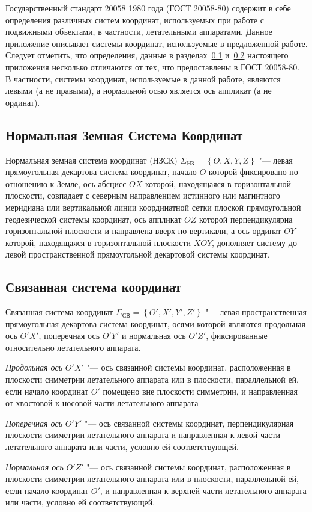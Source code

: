 \documentclass[../main.tex]{subfiles}
\begin{document}
Государственный стандарт $20058$ 1980 года (ГОСТ $20058$-$80$) содержит в себе определения различных систем координат, используемых при работе с подвижными объектами, в частности, летательными аппаратами. Данное приложение описывает системы координат, используемые в предложенной работе. Следует отметить, что определения, данные в разделах~\ref{sec:nzsk} и~\ref{sec:ssk} настоящего приложения несколько отличаются от тех, что предоставлены в ГОСТ $20058$-$80$. В частности, системы координат, используемые в данной работе, являются левыми (а не правыми), а нормальной осью является ось аппликат (а не ординат).

\subsection{Нормальная Земная Система Координат}\label{sec:nzsk}
Нормальная земная система координат (НЗСК) $\Sigma_{\text{НЗ}} = \left\{O, X, Y, Z\right\}$ "--- левая прямоугольная декартова система координат, начало $O$ которой фиксировано по отношению к Земле, ось абсцисс $OX$ которой, находящаяся в горизонтальной плоскости, совпадает с северным направлением истинного или магнитного меридиана или вертикальной линии координатной сетки плоской прямоугольной геодезической системы координат, ось аппликат $OZ$ которой перпендикулярна горизонтальной плоскости и направлена вверх по вертикали, а ось ординат $OY$ которой, находящаяся в горизонтальной плоскости $XOY$, дополняет систему до левой пространственной прямоугольной декартовой системы координат.

\subsection{Связанная система координат}\label{sec:ssk}
Связанная система координат $\Sigma_{\text{СВ}} = \left\{O', X', Y', Z'\right\}$ "--- левая пространственная прямоугольная декартова система координат, осями которой являются продольная ось $O'X'$, поперечная ось $O'Y'$ и нормальная ось $O'Z'$, фиксированные относительно летательного аппарата.

\textit{Продольная ось} $O'X'$ "--- ось связанной системы координат, расположенная в плоскости симметрии летательного аппарата или в плоскости, параллельной ей, если начало координат $O'$ помещено вне плоскости симметрии, и направленная от хвостовой к носовой части летательного аппарата

\textit{Поперечная ось} $O'Y'$ "--- ось связанной системы координат, перпендикулярная плоскости симметрии летательного аппарата и направленная к левой части летательного аппарата или части, условно ей соответствующей.

\textit{Нормальная ось} $O'Z'$ "--- ось связанной системы координат, расположенная в плоскости симметрии летательного аппарата или в плоскости, параллельной ей, если начало координат $O'$, и направленная к верхней части летательного аппарата или части, условно ей соответствующей.
\end{document}
